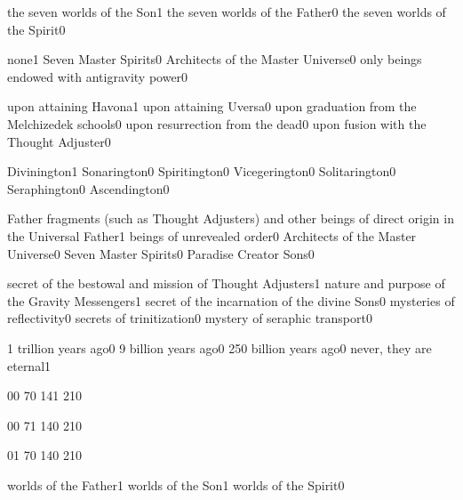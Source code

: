 {the seven worlds of the Son}{1}
{the seven worlds of the Father}{0}
{the seven worlds of the Spirit}{0}
\qstop

{none}{1}
{Seven Master Spirits}{0}
{Architects of the Master Universe}{0}
{only beings endowed with antigravity power}{0}
\qstop

{upon attaining Havona}{1}
{upon attaining Uversa}{0}
{upon graduation from the Melchizedek schools}{0}
{upon resurrection from the dead}{0}
{upon fusion with the Thought Adjuster}{0}
\qstop

{Divinington}{1}
{Sonarington}{0}
{Spiritington}{0}
{Vicegerington}{0}
{Solitarington}{0}
{Seraphington}{0}
{Ascendington}{0}
\qstop

{Father fragments (such as Thought Adjusters) and other beings of direct origin in the Universal Father}{1}
{beings of unrevealed order}{0}
{Architects of the Master Universe}{0}
{Seven Master Spirits}{0}
{Paradise Creator Sons}{0}
\qstop

{secret of the bestowal and mission of Thought Adjusters}{1}
{nature and purpose of the Gravity Messengers}{1}
{secret of the incarnation of the divine Sons}{0}
{mysteries of reflectivity}{0}
{secrets of trinitization}{0}
{mystery of seraphic transport}{0}
\qstop

{1 trillion years ago}{0}
{9 billion years ago}{0}
{250 billion years ago}{0}
{never, they are eternal}{1}
\qstop

{0}{0}
{7}{0}
{14}{1}
{21}{0}
\qstop

{0}{0}
{7}{1}
{14}{0}
{21}{0}
\qstop

{0}{1}
{7}{0}
{14}{0}
{21}{0}
\qstop

{worlds of the Father}{1}
{worlds of the Son}{1}
{worlds of the Spirit}{0}
\qstop

